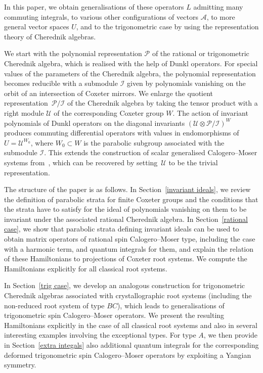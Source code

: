 \documentclass[12pt]{amsart}
\numberwithin{equation}{section}
\theoremstyle{definition}
\begin{document}
In this paper, we obtain 
generalisations of these operators $L$ admitting many 
commuting integrals, to various other configurations of vectors $\mathcal{A}$, to more general vector spaces $U$, and to the trigonometric case by using the representation theory of Cherednik algebras.  


We start with the polynomial representation $\mathcal{P}$ of the rational or trigonometric Cherednik algebra, which is realised 
with the help of Dunkl operators. For special values of the parameters of the Cherednik algebra, the polynomial representation becomes reducible with a submodule $\mathcal{I}$ given by polynomials vanishing on the orbit of an intersection of Coxeter mirrors. We enlarge  
the quotient representation~$\mathcal{P}/\mathcal{I}$ of the Cherednik algebra by taking the tensor product with 
a right module $\mathcal{U}$ of the corresponding Coxeter group $W$. The action of invariant polynomials of Dunkl operators on the diagonal invariants $(\mathcal{U} \otimes \mathcal{P}/\mathcal{I})^{W}$ produces commuting differential operators with values in endomorphisms of $U = \mathcal{U}^{W_0}$, where $W_0 \subset W$ is the parabolic subgroup associated with the submodule $\mathcal{I}$. This extends the construction of scalar generalised Calogero--Moser systems from~\cite{Feigin}, which can be recovered by setting~$\mathcal{U}$ to be the trivial representation.


The structure of the paper is as follows. In Section~\ref{invariant ideals}, we review the definition of parabolic strata for finite Coxeter groups and the conditions that the strata have to satisfy for the ideal of polynomials vanishing on them to be invariant under the associated rational Cherednik algebra. In Section~\ref{rational case}, we show that parabolic strata defining invariant ideals can be used to obtain matrix operators of rational spin Calogero--Moser type, including the case with a harmonic term, and quantum integrals for them, and explain the relation of these Hamiltonians to projections of Coxeter root systems. We compute the Hamiltonians explicitly for all classical root systems. 

In Section~\ref{trig case}, we develop an analogous construction for trigonometric Cherednik algebras associated with crystallographic root systems (including the non-reduced root system of type $BC$), which leads to generalisations of trigonometric spin Calogero--Moser operators. 
We present the resulting Hamiltonians explicitly in the case of all classical root systems and also in several interesting examples involving the exceptional types. For type $A$, we then provide in Section~\ref{extra integals} also additional quantum integrals for the corresponding deformed trigonometric spin Calogero--Moser operators by exploiting a Yangian symmetry. 
\end{document}
